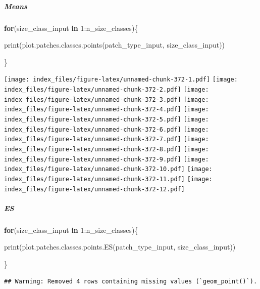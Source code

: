 \documentclass[
]{article}
\newenvironment{Shaded}{\begin{snugshade}}{\end{snugshade}}
\newcommand{\ControlFlowTok}[1]{\textcolor[rgb]{0.13,0.29,0.53}{\textbf{#1}}}
\newcommand{\DecValTok}[1]{\textcolor[rgb]{0.00,0.00,0.81}{#1}}
\newcommand{\FunctionTok}[1]{\textcolor[rgb]{0.00,0.00,0.00}{#1}}
\newcommand{\NormalTok}[1]{#1}
\newcommand{\SpecialCharTok}[1]{\textcolor[rgb]{0.00,0.00,0.00}{#1}}
\begin{document}
\hypertarget{means-35}{%
\subparagraph{Means}\label{means-35}}

\begin{Shaded}
\begin{Highlighting}[]
\ControlFlowTok{for}\NormalTok{(size\_class\_input }\ControlFlowTok{in} \DecValTok{1}\SpecialCharTok{:}\NormalTok{n\_size\_classes)\{}
  
  \FunctionTok{print}\NormalTok{(}\FunctionTok{plot.patches.classes.points}\NormalTok{(patch\_type\_input,}
\NormalTok{                            size\_class\_input))}
  
\NormalTok{\}}
\end{Highlighting}
\end{Shaded}

\texttt{[image: index\_files/figure-latex/unnamed-chunk-372-1.pdf]}
\texttt{[image: index\_files/figure-latex/unnamed-chunk-372-2.pdf]}
\texttt{[image: index\_files/figure-latex/unnamed-chunk-372-3.pdf]}
\texttt{[image: index\_files/figure-latex/unnamed-chunk-372-4.pdf]}
\texttt{[image: index\_files/figure-latex/unnamed-chunk-372-5.pdf]}
\texttt{[image: index\_files/figure-latex/unnamed-chunk-372-6.pdf]}
\texttt{[image: index\_files/figure-latex/unnamed-chunk-372-7.pdf]}
\texttt{[image: index\_files/figure-latex/unnamed-chunk-372-8.pdf]}
\texttt{[image: index\_files/figure-latex/unnamed-chunk-372-9.pdf]}
\texttt{[image: index\_files/figure-latex/unnamed-chunk-372-10.pdf]}
\texttt{[image: index\_files/figure-latex/unnamed-chunk-372-11.pdf]}
\texttt{[image: index\_files/figure-latex/unnamed-chunk-372-12.pdf]}

\hypertarget{es-15}{%
\subparagraph{ES}\label{es-15}}

\begin{Shaded}
\begin{Highlighting}[]
\ControlFlowTok{for}\NormalTok{(size\_class\_input }\ControlFlowTok{in} \DecValTok{1}\SpecialCharTok{:}\NormalTok{n\_size\_classes)\{}
  
  \FunctionTok{print}\NormalTok{(}\FunctionTok{plot.patches.classes.points.ES}\NormalTok{(patch\_type\_input,}
\NormalTok{                            size\_class\_input))}
  
\NormalTok{\}}
\end{Highlighting}
\end{Shaded}

\begin{verbatim}
## Warning: Removed 4 rows containing missing values (`geom_point()`).
\end{verbatim}
\end{document}
